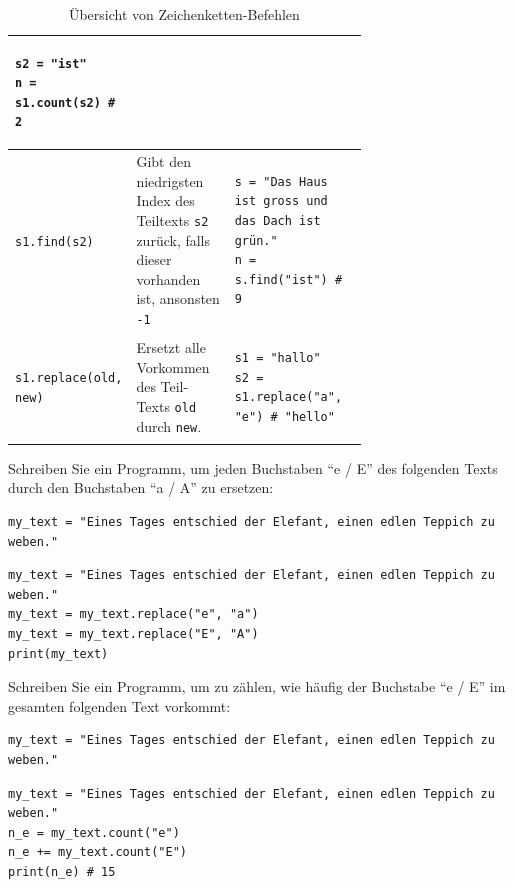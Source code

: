 \begin{table}[H]
\begin{tabular}{l|p{0.3\linewidth}|p{0.4\linewidth}}
\begin{minipage}{\linewidth}
\begin{lstlisting}[numbers=none]
s2 = "ist"
n = s1.count(s2) # 2
\end{lstlisting}
\end{minipage}\\\midrule
\lstinline|s1.find(s2)| & Gibt den niedrigsten Index des Teiltexts \lstinline|s2| zurück, falls dieser vorhanden ist, ansonsten \lstinline|-1| & \begin{minipage}{\linewidth}
\begin{lstlisting}[numbers=none]
s = "Das Haus ist gross und das Dach ist grün."
n = s.find("ist") # 9
\end{lstlisting}
\end{minipage}\\\midrule
\lstinline|s1.replace(old, new)| & Ersetzt alle Vorkommen des Teil-Texts \lstinline|old| durch \lstinline|new|. & \begin{minipage}{\linewidth}
\begin{lstlisting}[numbers=none]
s1 = "hallo"
s2 = s1.replace("a", "e") # "hello"
\end{lstlisting}
\end{minipage}
\end{tabular}
\caption{Übersicht von Zeichenketten-Befehlen}
\label{tab:string-op}
\end{table}
\begin{myexercise}
Schreiben Sie ein Programm, um jeden Buchstaben \enquote{e / E} des folgenden Texts durch den Buchstaben \enquote{a / A} zu ersetzen:

\begin{lstlisting}
my_text = "Eines Tages entschied der Elefant, einen edlen Teppich zu weben."
\end{lstlisting}

\begin{myanswer}
\begin{lstlisting}
my_text = "Eines Tages entschied der Elefant, einen edlen Teppich zu weben."
my_text = my_text.replace("e", "a")
my_text = my_text.replace("E", "A")
print(my_text)
\end{lstlisting}
\end{myanswer}
\end{myexercise}

\begin{myexercise}
Schreiben Sie ein Programm, um zu zählen, wie häufig der Buchstabe \enquote{e / E} im gesamten folgenden Text vorkommt:

\begin{lstlisting}
my_text = "Eines Tages entschied der Elefant, einen edlen Teppich zu weben."
\end{lstlisting}

\begin{myanswer}
\begin{lstlisting}
my_text = "Eines Tages entschied der Elefant, einen edlen Teppich zu weben."
n_e = my_text.count("e")
n_e += my_text.count("E")
print(n_e) # 15
\end{lstlisting}
\end{myanswer}
\end{myexercise}


